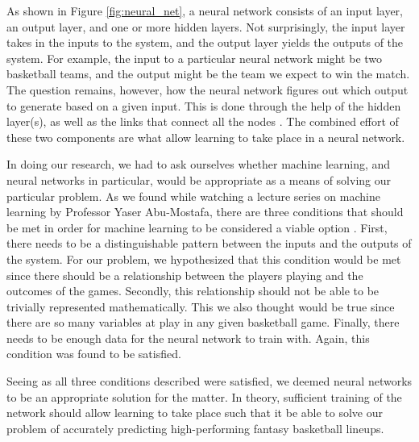 As shown in Figure \ref{fig:neural_net}, a neural network consists of an input layer, an output layer, and one or more hidden layers. Not surprisingly, the input layer takes in the inputs to the system, and the output layer yields the outputs of the system. For example, the input to a particular neural network might be two basketball teams, and the output might be the team we expect to win the match. The question remains, however, how the neural network figures out which output to generate based on a given input. This is done through the help of the hidden layer(s), as well as the links that connect all the nodes \cite{neural_net_fundies}. The combined effort of these two components are what allow learning to take place in a neural network.

In doing our research, we had to ask ourselves whether machine learning, and neural networks in particular, would be appropriate as a means of solving our particular problem. As we found while watching a lecture series on machine learning by Professor Yaser Abu-Mostafa, there are three conditions that should be met in order for machine learning to be considered a viable option \cite{caltech}. First, there needs to be a distinguishable pattern between the inputs and the outputs of the system. For our problem, we hypothesized that this condition would be met since there should be a relationship between the players playing and the outcomes of the games. Secondly, this relationship should not be able to be trivially represented mathematically. This we also thought would be true since there are so many variables at play in any given basketball game. Finally, there needs to be enough data for the neural network to train with. Again, this condition was found to be satisfied. 

Seeing as all three conditions described were satisfied, we deemed neural networks to be an appropriate solution for the matter. In theory, sufficient training of the network should allow learning to take place such that it be able to solve our problem of accurately predicting high-performing fantasy basketball lineups.